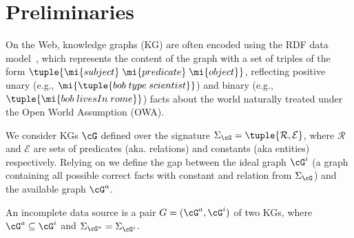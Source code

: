 
\section{Preliminaries}\label{sec:prelim}

 On the Web, knowledge graphs (KG) are often encoded using the RDF data
model~\cite{rdf}, which represents the content of the graph with a set of
triples of the form $\tuple{\mi{subject}\;\mi{predicate}\;\mi{object}}$, reflecting positive unary (e.g., $\mi{\tuple{bob\;type\;scientist}}$) and binary (e.g., $\tuple{\mi{bob\;livesIn\;rome}}$) facts about the world naturally treated under the Open World Assumption (OWA).  %


We %
consider KGs $\cG$ defined over the signature
$\Sigma_{\cG}=\tuple{\mathcal{R},\mathcal{E}}$, where $\mathcal{R}$ and $\mathcal{E}$ are sets of
predicates (aka. relations) and constants (aka entities) respectively. 
Relying on \cite{DBLP:conf/semweb/DarariNPR13} we define the gap between the ideal graph %
$\cG^i$ (a graph containing all possible correct facts with constant and relation from $\Sigma_{\cG}$) and the available graph $\cG^a$. 

\begin{definition} An incomplete data source is a pair
    $G = (\cG^a, \cG^i)$ of two KGs, where $\cG^a\subseteq \cG^i$ and
    $\Sigma_{\cG^a}=\Sigma_{\cG^i}$. 
\end{definition}


